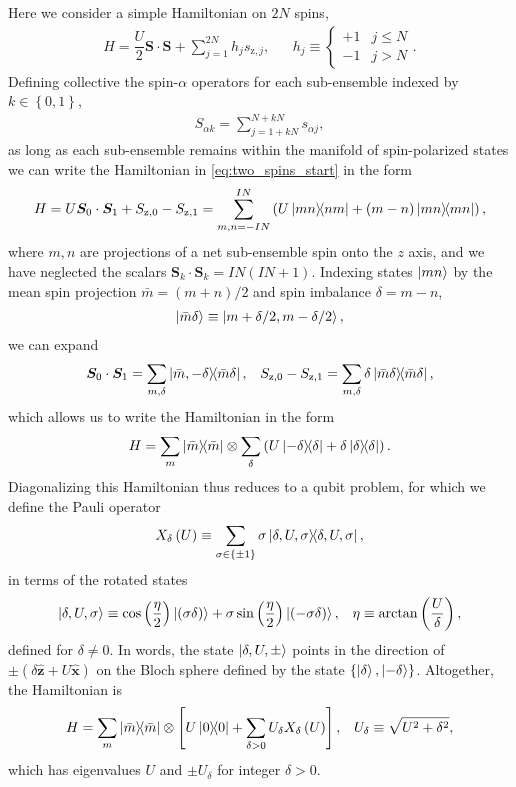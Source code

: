 \documentclass[nofootinbib,notitlepage,11pt]{revtex4-2}
\newcommand{\f}[2]{\dfrac{#1}{#2}} %
\newcommand{\p}[1]{\left(#1\right)} %
\renewcommand{\sp}[1]{\left[#1\right]} %
\renewcommand{\set}[1]{\left\{#1\right\}} %
\renewcommand{\v}{\bm} %
\newcommand{\uv}[1]{\bm{\hat{#1}}} %
\renewcommand{\c}{\cdot} %
\newcommand{\1}{\mathds{1}}
\newcommand{\z}{\text{z}}
\begin{document}
Here we consider a simple Hamiltonian on $2N$ spins,
\begin{align}
  H = \f{U}{2} \v S\c\v S + \sum_{j=1}^{2N} h_j s_{\z,j},
  &&
  h_j \equiv
  \begin{cases}
    +1 & j \le N \\
    -1 & j > N
  \end{cases}.
  \label{eq:two_spins_start}
\end{align}
Defining collective the spin-$\alpha$ operators for each sub-ensemble indexed by $k\in\set{0,1}$,
\begin{align}
  S_{\alpha k} = \sum_{j=1+kN}^{N+kN} s_{\alpha j},
\end{align}
as long as each sub-ensemble remains within the manifold of spin-polarized states we can write the Hamiltonian in \eqref{eq:two_spins_start} in the form
\begin{align}
  H = U \v S_0 \c\v S_1 + S_{\z,0} - S_{\z,1}
  = \sum_{m,n=-IN}^{IN} \p{U\op{mn}{nm}
    + \p{m-n}\op{mn}},
\end{align}
where $m,n$ are projections of a net sub-ensemble spin onto the $z$ axis, and we have neglected the scalars $\v S_k\cdot \v S_k = IN\p{IN+1}$.
Indexing states $\ket{mn}$ by the mean spin projection $\bar m=\p{m+n}/2$ and spin imbalance $\delta=m-n$,
\begin{align}
  \ket{\bar m\delta} \equiv \ket{m+\delta/2,m-\delta/2},
\end{align}
we can expand
\begin{align}
  \v S_0\c \v S_1 = \sum_{m,\delta}
  \op{\bar m,-\delta}{\bar m\delta},
  &&
  S_{\z,0} - S_{\z,1} = \sum_{m,\delta} \delta \op{\bar m\delta},
\end{align}
which allows us to write the Hamiltonian in the form
\begin{align}
  H = \sum_m \op{\bar m} \otimes
  \sum_\delta \p{U \op{-\delta}{\delta} + \delta \op{\delta}}.
\end{align}
Diagonalizing this Hamiltonian thus reduces to a qubit problem, for which we define the Pauli operator
\begin{align}
  X_\delta\p{U} \equiv \sum_{\sigma\in\set{\pm1}}
  \sigma \op{\delta,U,\sigma},
\end{align}
in terms of the rotated states
\begin{align}
  \ket{\delta,U,\sigma} \equiv \cos\p{\f{\eta}{2}} \ket{\p{\sigma\delta}}
  + \sigma \sin\p{\f{\eta}{2}} \ket{\p{-\sigma\delta}},
  &&
  \eta \equiv \arctan\p{\f{U}{\delta}},
\end{align}
defined for $\delta\ne0$.
In words, the state $\ket{\delta,U,\pm}$ points in the direction of $\pm\p{\delta\uv{z}+U\uv{x}}$ on the Bloch sphere defined by the state $\set{\ket{\delta},\ket{-\delta}}$.
Altogether, the Hamiltonian is
\begin{align}
  H = \sum_m \op{\bar m} \otimes
  \sp{U\op{0} + \sum_{\delta>0} U_\delta X_\delta\p{U}},
  &&
  U_\delta \equiv \sqrt{U^2+\delta^2},
\end{align}
which has eigenvalues $U$ and $\pm U_\delta$ for integer $\delta>0$.
\end{document}
